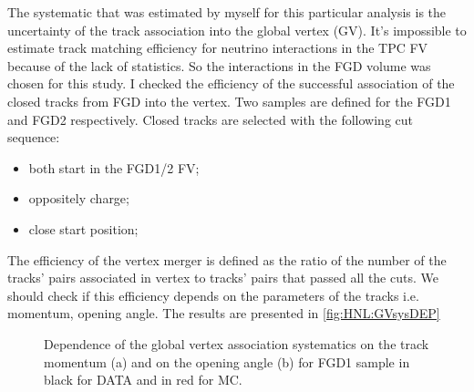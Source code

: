 \documentclass[../main.tex]{subfiles}
\begin{document}
The systematic that was estimated by myself for this particular analysis is the uncertainty of the track association into the global vertex (GV). It's impossible to estimate track matching efficiency for neutrino interactions in the TPC FV because of the lack of statistics. So the interactions in the FGD volume was chosen for this study. I checked the efficiency of the successful association of the closed tracks from FGD into the vertex. Two samples are defined for the FGD1 and FGD2 respectively. Closed tracks are selected with the following cut sequence:
\begin{itemize}
    \item both start in the FGD1/2 FV;
    \item oppositely charge;
    \item close start position;
\end{itemize}
The efficiency of the vertex merger is defined as the ratio of the number of the tracks' pairs associated in vertex to tracks' pairs that passed all the cuts. We should check if this efficiency depends on the parameters of the tracks i.e. momentum, opening angle. The results are presented in \autoref{fig:HNL:GVsysDEP}
\begin{figure}[!ht]
    \begin{minipage}[h]{0.49\linewidth}
    \end{minipage}
    \hfill
    \begin{minipage}[h]{0.49\linewidth}
    \end{minipage}
    \vfill
    \begin{minipage}[h]{0.49\linewidth}
    \end{minipage}
    \hfill
    \begin{minipage}[h]{0.49\linewidth}
    \end{minipage}
    \caption{Dependence of the global vertex association systematics on the  track momentum (a) and on the opening angle (b) for FGD1 sample in black for DATA and in red for MC.}
    \label{fig:HNL:GVsysDEP}
\end{figure}
\end{document}

